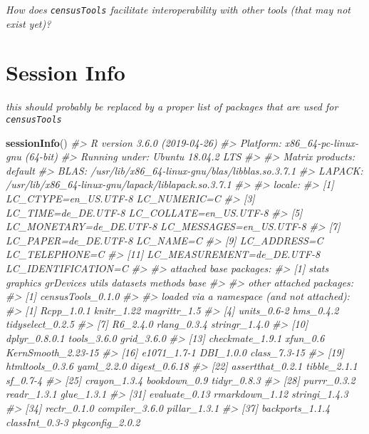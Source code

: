 \documentclass[12pt,]{article}
\newenvironment{Shaded}{}{}
\newcommand{\CommentTok}[1]{\textcolor[rgb]{0.38,0.63,0.69}{\textit{#1}}}
\newcommand{\KeywordTok}[1]{\textcolor[rgb]{0.00,0.44,0.13}{\textbf{#1}}}
\newcommand{\NormalTok}[1]{#1}
\begin{document}
\emph{How does \texttt{censusTools} facilitate interoperability with other tools (that may not exist yet)?}

\hypertarget{session-info}{%
\section{Session Info}\label{session-info}}

\emph{this should probably be replaced by a proper list of packages that are used for \texttt{censusTools}}

\begin{Shaded}
\begin{Highlighting}[]
\KeywordTok{sessionInfo}\NormalTok{()}
\CommentTok{#> R version 3.6.0 (2019-04-26)}
\CommentTok{#> Platform: x86_64-pc-linux-gnu (64-bit)}
\CommentTok{#> Running under: Ubuntu 18.04.2 LTS}
\CommentTok{#> }
\CommentTok{#> Matrix products: default}
\CommentTok{#> BLAS:   /usr/lib/x86_64-linux-gnu/blas/libblas.so.3.7.1}
\CommentTok{#> LAPACK: /usr/lib/x86_64-linux-gnu/lapack/liblapack.so.3.7.1}
\CommentTok{#> }
\CommentTok{#> locale:}
\CommentTok{#>  [1] LC_CTYPE=en_US.UTF-8       LC_NUMERIC=C              }
\CommentTok{#>  [3] LC_TIME=de_DE.UTF-8        LC_COLLATE=en_US.UTF-8    }
\CommentTok{#>  [5] LC_MONETARY=de_DE.UTF-8    LC_MESSAGES=en_US.UTF-8   }
\CommentTok{#>  [7] LC_PAPER=de_DE.UTF-8       LC_NAME=C                 }
\CommentTok{#>  [9] LC_ADDRESS=C               LC_TELEPHONE=C            }
\CommentTok{#> [11] LC_MEASUREMENT=de_DE.UTF-8 LC_IDENTIFICATION=C       }
\CommentTok{#> }
\CommentTok{#> attached base packages:}
\CommentTok{#> [1] stats     graphics  grDevices utils     datasets  methods   base     }
\CommentTok{#> }
\CommentTok{#> other attached packages:}
\CommentTok{#> [1] censusTools_0.1.0}
\CommentTok{#> }
\CommentTok{#> loaded via a namespace (and not attached):}
\CommentTok{#>  [1] Rcpp_1.0.1         knitr_1.22         magrittr_1.5      }
\CommentTok{#>  [4] units_0.6-2        hms_0.4.2          tidyselect_0.2.5  }
\CommentTok{#>  [7] R6_2.4.0           rlang_0.3.4        stringr_1.4.0     }
\CommentTok{#> [10] dplyr_0.8.0.1      tools_3.6.0        grid_3.6.0        }
\CommentTok{#> [13] checkmate_1.9.1    xfun_0.6           KernSmooth_2.23-15}
\CommentTok{#> [16] e1071_1.7-1        DBI_1.0.0          class_7.3-15      }
\CommentTok{#> [19] htmltools_0.3.6    yaml_2.2.0         digest_0.6.18     }
\CommentTok{#> [22] assertthat_0.2.1   tibble_2.1.1       sf_0.7-4          }
\CommentTok{#> [25] crayon_1.3.4       bookdown_0.9       tidyr_0.8.3       }
\CommentTok{#> [28] purrr_0.3.2        readr_1.3.1        glue_1.3.1        }
\CommentTok{#> [31] evaluate_0.13      rmarkdown_1.12     stringi_1.4.3     }
\CommentTok{#> [34] rectr_0.1.0        compiler_3.6.0     pillar_1.3.1      }
\CommentTok{#> [37] backports_1.1.4    classInt_0.3-3     pkgconfig_2.0.2}
\end{Highlighting}
\end{Shaded}
\end{document}
